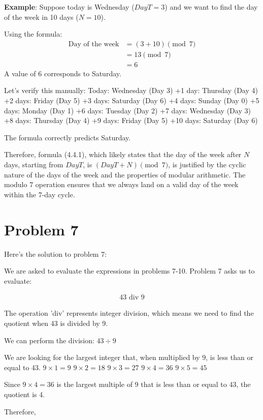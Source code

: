 \documentclass{article}
\begin{document}
\textbf{Example}:
Suppose today is Wednesday ($DayT = 3$) and we want to find the day of the week in 10 days ($N = 10$).

Using the formula:
\begin{align} \text{Day of the week} &= (3 + 10) \pmod{7} \\ &= 13 \pmod{7} \\ &= 6 \end{align}
A value of 6 corresponds to Saturday.

Let's verify this manually:
Today: Wednesday (Day 3)
+1 day: Thursday (Day 4)
+2 days: Friday (Day 5)
+3 days: Saturday (Day 6)
+4 days: Sunday (Day 0)
+5 days: Monday (Day 1)
+6 days: Tuesday (Day 2)
+7 days: Wednesday (Day 3)
+8 days: Thursday (Day 4)
+9 days: Friday (Day 5)
+10 days: Saturday (Day 6)

The formula correctly predicts Saturday.

Therefore, formula (4.4.1), which likely states that the day of the week after $N$ days, starting from $DayT$, is $(DayT + N) \pmod{7}$, is justified by the cyclic nature of the days of the week and the properties of modular arithmetic. The modulo 7 operation ensures that we always land on a valid day of the week within the 7-day cycle.

\newpage

\section*{\textbf{Problem 7}}
Here's the solution to problem 7:

We are asked to evaluate the expressions in problems 7-10. Problem 7 asks us to evaluate:

\begin{align} \label{eq:1} 43 \text{ div } 9 \end{align}

The operation 'div' represents integer division, which means we need to find the quotient when 43 is divided by 9.

We can perform the division:
$43 \div 9$

We are looking for the largest integer that, when multiplied by 9, is less than or equal to 43.
$9 \times 1 = 9$
$9 \times 2 = 18$
$9 \times 3 = 27$
$9 \times 4 = 36$
$9 \times 5 = 45$

Since $9 \times 4 = 36$ is the largest multiple of 9 that is less than or equal to 43, the quotient is 4.

Therefore,
\end{document}
